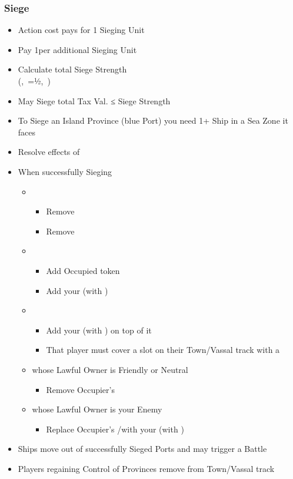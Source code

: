 \documentclass[10pt]{article}
\begin{document}
\subsubsection*{Siege }
\begin{itemize}
	\item Action cost pays for 1 Sieging Unit
	\item Pay 1\milpower per additional Sieging Unit 
	\item Calculate total Siege Strength\\(, \cavalry=½, )
	\item May Siege total Tax Val. ≤ Siege Strength
	\item To Siege an Island Province (blue Port) you need 1+ Ship in a Sea Zone it faces
	\item Resolve effects of 
	\item When successfully Sieging
	\begin{itemize}
		\item {}
		\begin{itemize}
			\item Remove \rebeltown
			\item Remove \unrest
		\end{itemize}
		\item {}
		\begin{itemize}
			\item Add Occupied token
			\item Add your \town (with \unrest)
		\end{itemize}
		\item {}
		\begin{itemize}
			\item Add your \town (with \unrest) on top of it
			\item That player must cover a slot on their Town/Vassal track with a \cube
		\end{itemize}
		\item {} whose Lawful Owner is Friendly or Neutral
		\begin{itemize}
			\item Remove Occupier's \town
		\end{itemize}
		\item {} whose Lawful Owner is your Enemy
		\begin{itemize}
			\item Replace Occupier's \town/\rebeltown with your \town (with \unrest)
		\end{itemize}
	\end{itemize}
	\item Ships move out of successfully Sieged Ports and may trigger a Battle
	\item Players regaining Control of Provinces remove \cubes from Town/Vassal track
\end{itemize}
\end{document}
